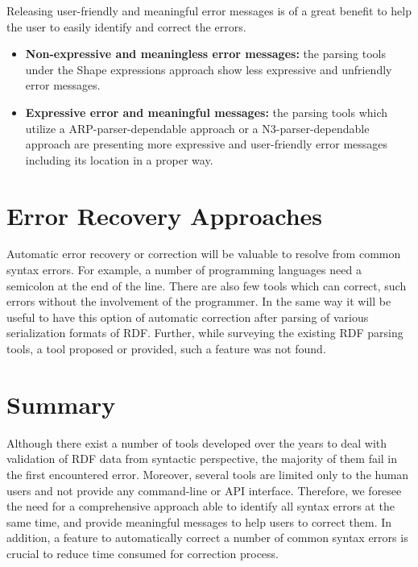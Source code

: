 Releasing user-friendly and meaningful error messages is of a great benefit to help the user to easily identify and correct the errors. 
\begin{itemize}
    \item \textbf{Non-expressive and meaningless error messages:} the parsing tools under the Shape expressions approach show less expressive and unfriendly error messages.
    \item \textbf{Expressive error and meaningful messages:} the parsing tools which utilize a ARP-parser-dependable approach or a N3-parser-dependable approach are presenting more expressive and user-friendly error messages including its location in a proper way. 
    
\end{itemize}

\section{Error Recovery Approaches}
Automatic error recovery or correction will be valuable to resolve from common syntax errors. 
For example, a number of programming languages need a semicolon at the end of the line. 
There are also few tools which can correct, such errors without the involvement of the programmer. 
In the same way it will be useful to have this option of automatic correction after parsing of various serialization formats of RDF. 
Further, while surveying the existing RDF parsing tools, a tool proposed or provided, such a feature was not found.  

\section{Summary}

Although there exist a number of tools developed over the years to deal with validation of RDF data from syntactic perspective, the majority of them fail in the first encountered error.
Moreover, several tools are limited only to the human users and not provide any command-line or API interface.
Therefore, we foresee the need for a comprehensive approach able to identify all syntax errors at the same time, and provide meaningful messages to help users to correct them.
In addition, a feature to automatically correct a number of common syntax errors is crucial to reduce time consumed for correction process.  











